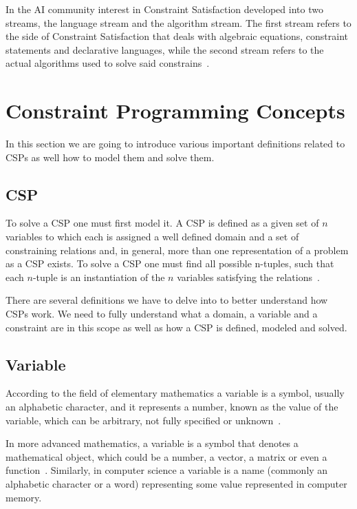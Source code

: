 In the AI community interest in Constraint Satisfaction developed into two streams, the language stream and the algorithm stream. The first stream refers to the side of Constraint Satisfaction that deals with algebraic equations, constraint statements and declarative languages, while the second stream refers to the actual algorithms used to solve said constrains~\cite{rossi2006handbook}.

\section{Constraint Programming Concepts}
\label{deeper}

In this section we are going to introduce various important definitions related to \acp{CSP} as well how to model them and solve them.

\subsection{\acf{CSP}}

To solve a \ac{CSP} one must first model it. A \ac{CSP} is defined as a given set of $n$ variables to which each is assigned a well defined domain and a set of constraining relations and, in general, more than one representation of a problem as a \ac{CSP} exists. To solve a \ac{CSP} one must find all possible n-tuples, such that each $n$-tuple is an instantiation of the $n$ variables satisfying the relations~\cite{freuder1978synthesizing}. 

There are several definitions we have to delve into to better understand how \acp{CSP} work. We need to fully understand what a domain, a variable and a constraint are in this scope as well as how a \ac{CSP} is defined, modeled and solved. 

\subsection{Variable}

According to the field of elementary mathematics a variable is a symbol, usually an alphabetic character, and it represents a number, known as the value of the variable, which can be arbitrary, not fully specified or unknown~\cite{Menger1954}.

In more advanced mathematics, a variable is a symbol that denotes a mathematical object, which could be a number, a vector, a matrix or even a function~\cite{quine1960variables}. Similarly, in computer science a variable is a name (commonly an alphabetic character or a word) representing some value represented in computer memory.

